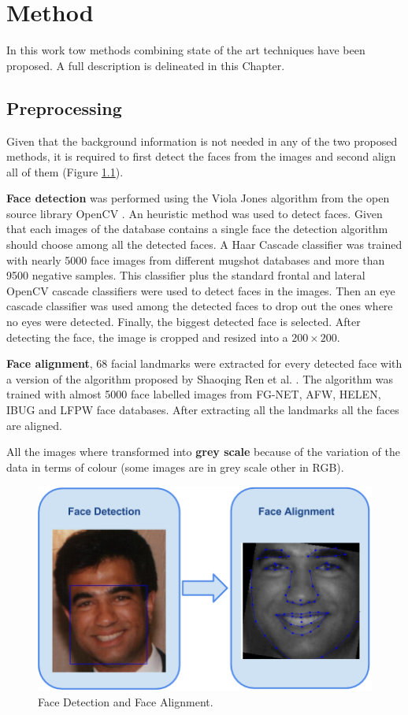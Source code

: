 \chapter{Method} \label{chap:method}
In this work tow methods combining state of the art techniques have been proposed. A full description is delineated in this Chapter.

\section{Preprocessing}

Given that the background information is not needed in any of the two proposed methods, it is required to first detect the faces from the images and second align all of them (Figure \ref{fig:preprocessing}).

\textbf{Face detection} was performed using the Viola Jones algorithm from the open source library OpenCV \cite{opencv_library}. An heuristic method was used to detect faces. Given that each images of the database contains a single face the detection algorithm should choose among all the detected faces. A Haar Cascade classifier was trained with nearly 5000 face images from different mugshot databases and more than 9500 negative samples. This classifier plus the standard frontal and lateral OpenCV cascade classifiers were used to detect faces in the images. Then an eye cascade classifier was used among the detected faces to drop out the ones where no eyes were detected. Finally, the biggest detected face is selected. After detecting the face, the image is cropped and resized into a $200 \times 200$.

\textbf{Face alignment}, 68 facial landmarks were extracted for every detected face with a version of the algorithm proposed by Shaoqing Ren et al. \cite{ren2014face}. The algorithm was trained with almost 5000 face labelled images from FG-NET, AFW, HELEN, IBUG and LFPW face databases. After extracting all the landmarks all the faces are aligned.

All the images where transformed into \textbf{grey scale} because of the variation of the data in terms of colour (some images are in grey scale other in RGB).

\begin{figure}[!h]
	\centering
	\includegraphics[width=\textwidth]{figures/preprocessing}
	\caption{Face Detection and Face Alignment.}
	\label{fig:preprocessing}
\end{figure}


